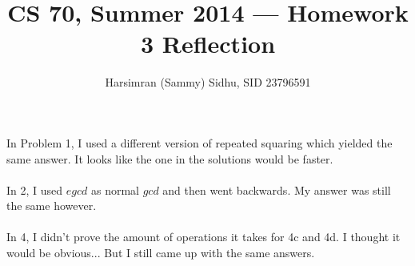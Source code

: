\documentclass[11pt,letterpaper]{article}
\title{CS 70, Summer 2014 --- Homework 3 Reflection} %
\author{Harsimran (Sammy) Sidhu, SID 23796591} %
\begin{document}
\maketitle

In Problem 1, I used a different version of repeated squaring which yielded the same answer. It looks like the one in the solutions would be faster.\\
\\
In 2, I used $egcd$ as normal $gcd$ and then went backwards. My answer was still the same however.\\
\\
In 4, I didn't prove the amount of operations it takes for 4c and 4d. I thought it would be obvious... But I still came up with the same answers.\\ 
\end{document}
